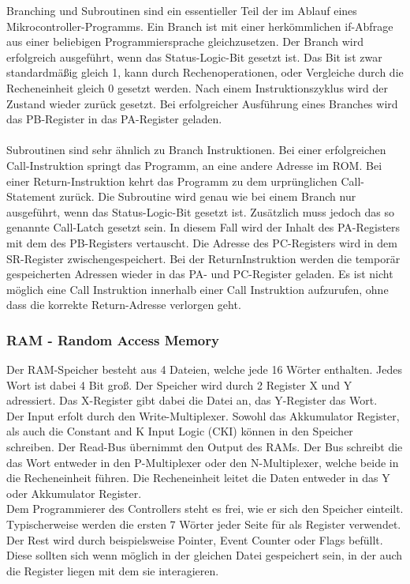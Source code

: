 Branching und Subroutinen sind ein essentieller Teil der im Ablauf eines Mikrocontroller-Programms. Ein Branch ist mit einer herk{\"o}mmlichen if-Abfrage aus einer beliebigen Programmiersprache gleichzusetzen. Der Branch wird erfolgreich ausgef{\"u}hrt, wenn das Status-Logic-Bit gesetzt ist. Das Bit ist zwar standardm{\"a}{\ss}ig gleich 1, kann durch Rechenoperationen, oder Vergleiche durch die Recheneinheit gleich 0 gesetzt werden. Nach einem Instruktionszyklus wird der Zustand wieder zur{\"u}ck gesetzt. Bei erfolgreicher Ausf{\"u}hrung eines Branches wird das PB-Register in das PA-Register geladen. \\
\\
Subroutinen sind sehr {\"a}hnlich zu Branch Instruktionen. Bei einer erfolgreichen Call-Instruktion springt das Programm, an eine andere Adresse im ROM. Bei einer Return-Instruktion kehrt das Programm zu dem urpr{\"u}nglichen Call-Statement zur{\"u}ck. Die Subroutine wird genau wie bei einem Branch nur ausgef{\"u}hrt, wenn das Status-Logic-Bit gesetzt ist. Zus{\"a}tzlich muss jedoch das so genannte Call-Latch gesetzt sein. In diesem Fall wird der Inhalt des PA-Registers mit dem des PB-Registers vertauscht. Die Adresse des PC-Registers wird in dem SR-Register zwischengespeichert. Bei der ReturnInstruktion werden die tempor{\"a}r gespeicherten Adressen wieder in das PA- und PC-Register geladen. Es ist nicht m{\"o}glich eine Call Instruktion innerhalb einer Call Instruktion aufzurufen, ohne dass die korrekte Return-Adresse verlorgen geht.

\subsubsection{RAM - Random Access Memory}

Der RAM-Speicher besteht aus 4 Dateien, welche jede 16 W{\"o}rter enthalten. Jedes Wort ist dabei 4 Bit gro{\ss}. Der Speicher wird durch 2 Register X und Y adressiert. Das X-Register gibt dabei die Datei an, das Y-Register das Wort.\\
Der Input erfolt durch den Write-Multiplexer. Sowohl das Akkumulator Register, als auch die Constant and K Input Logic (CKI) k{\"o}nnen in den Speicher schreiben. Der Read-Bus {\"u}bernimmt den Output des RAMs. Der Bus schreibt die das Wort entweder in den P-Multiplexer oder den N-Multiplexer, welche beide in die Recheneinheit f{\"u}hren. Die Recheneinheit leitet die Daten entweder in das Y oder Akkumulator Register. \\
Dem Programmierer des Controllers steht es frei, wie er sich den Speicher einteilt. Typischerweise werden die ersten 7 W{\"o}rter jeder Seite f{\"u}r als Register verwendet. Der Rest wird durch beispielsweise Pointer, Event Counter oder Flags bef{\"u}llt. Diese sollten sich wenn m{\"o}glich in der gleichen Datei gespeichert sein, in der auch die Register liegen mit dem sie interagieren.

